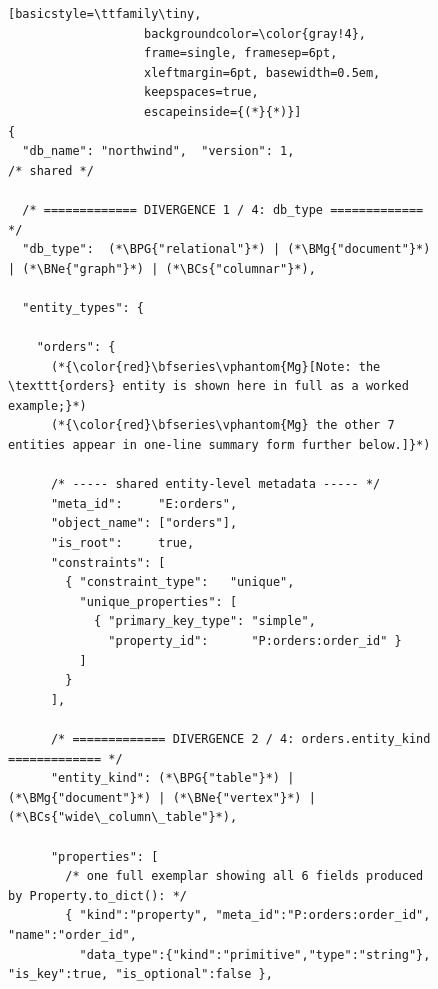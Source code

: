 \begin{figure}[htbp]
\centering
\providecommand{\BPG}[1]{{\setlength{\fboxsep}{1pt}\colorbox{blue!22}{\vphantom{Mg}#1}}}
\providecommand{\BMg}[1]{{\setlength{\fboxsep}{1pt}\colorbox{green!28}{\vphantom{Mg}#1}}}
\providecommand{\BNe}[1]{{\setlength{\fboxsep}{1pt}\colorbox{orange!35}{\vphantom{Mg}#1}}}
\providecommand{\BCs}[1]{{\setlength{\fboxsep}{1pt}\colorbox{purple!22}{\vphantom{Mg}#1}}}
\begin{lstlisting}[basicstyle=\ttfamily\tiny,
                   backgroundcolor=\color{gray!4},
                   frame=single, framesep=6pt,
                   xleftmargin=6pt, basewidth=0.5em,
                   keepspaces=true,
                   escapeinside={(*}{*)}]
{
  "db_name": "northwind",  "version": 1,                                     /* shared */

  /* ============= DIVERGENCE 1 / 4: db_type ============= */
  "db_type":  (*\BPG{"relational"}*) | (*\BMg{"document"}*) | (*\BNe{"graph"}*) | (*\BCs{"columnar"}*),

  "entity_types": {

    "orders": {
      (*{\color{red}\bfseries\vphantom{Mg}[Note: the \texttt{orders} entity is shown here in full as a worked example;}*)
      (*{\color{red}\bfseries\vphantom{Mg} the other 7 entities appear in one-line summary form further below.]}*)

      /* ----- shared entity-level metadata ----- */
      "meta_id":     "E:orders",
      "object_name": ["orders"],
      "is_root":     true,
      "constraints": [
        { "constraint_type":   "unique",
          "unique_properties": [
            { "primary_key_type": "simple",
              "property_id":      "P:orders:order_id" }
          ]
        }
      ],

      /* ============= DIVERGENCE 2 / 4: orders.entity_kind ============= */
      "entity_kind": (*\BPG{"table"}*) | (*\BMg{"document"}*) | (*\BNe{"vertex"}*) | (*\BCs{"wide\_column\_table"}*),

      "properties": [
        /* one full exemplar showing all 6 fields produced by Property.to_dict(): */
        { "kind":"property", "meta_id":"P:orders:order_id", "name":"order_id",
          "data_type":{"kind":"primitive","type":"string"}, "is_key":true, "is_optional":false },


\end{lstlisting}
\end{figure}
